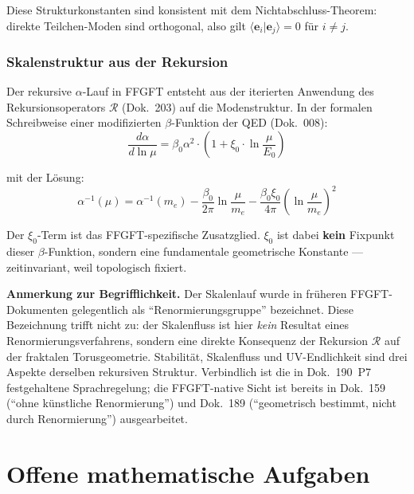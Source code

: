 Diese Strukturkonstanten sind konsistent mit dem Nichtabschluss-Theorem:
direkte Teilchen-Moden sind orthogonal, also gilt
$\langle\mathbf{e}_i|\mathbf{e}_j\rangle = 0$ für $i \neq j$.

\section{Skalenstruktur aus der Rekursion}

Der rekursive $\alpha$-Lauf in FFGFT entsteht aus der iterierten
Anwendung des Rekursionsoperators $\mathcal{R}$ (Dok.~203) auf die
Modenstruktur. In der formalen Schreibweise einer modifizierten
$\beta$-Funktion der QED (Dok.~008):
\begin{equation}
  \frac{d\alpha}{d\ln\mu}
  = \beta_0\alpha^2\cdot\left(1 + \xi_0\cdot\ln\frac{\mu}{E_0}\right)
\end{equation}

mit der Lösung:
\begin{equation}
  \alpha^{-1}(\mu)
  = \alpha^{-1}(m_e)
    - \frac{\beta_0}{2\pi}\ln\frac{\mu}{m_e}
    - \frac{\beta_0\xi_0}{4\pi}\left(\ln\frac{\mu}{m_e}\right)^2
\end{equation}

Der $\xi_0$-Term ist das FFGFT-spezifische Zusatzglied.
$\xi_0$ ist dabei \textbf{kein} Fixpunkt dieser $\beta$-Funktion,
sondern eine fundamentale geometrische Konstante --- zeitinvariant,
weil topologisch fixiert.

\medskip

\textbf{Anmerkung zur Begrifflichkeit.}
Der Skalenlauf wurde in früheren FFGFT-Dokumenten gelegentlich als
\enquote{Renormierungsgruppe} bezeichnet. Diese Bezeichnung trifft
nicht zu: der Skalenfluss ist hier \emph{kein} Resultat eines
Renormierungsverfahrens, sondern eine direkte Konsequenz der Rekursion
$\mathcal{R}$ auf der fraktalen Torusgeometrie. Stabilität, Skalenfluss
und UV-Endlichkeit sind drei Aspekte derselben rekursiven Struktur.
Verbindlich ist die in Dok.~190~P7 festgehaltene Sprachregelung; die
FFGFT-native Sicht ist bereits in Dok.~159 (\enquote{ohne künstliche
Renormierung}) und Dok.~189 (\enquote{geometrisch bestimmt, nicht durch
Renormierung}) ausgearbeitet.

\part{Offene mathematische Aufgaben}

